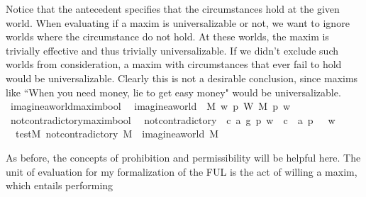 \begin{isabellebody}
{Notice that the antecedent specifies that the circumstances hold at the given world. 
When evaluating if a maxim is universalizable or not, we want to ignore worlds where the circumstance 
do not hold. At these worlds, the maxim is trivially effective and thus trivially universalizable. If we didn't exclude such worlds from 
consideration, a maxim with circumstances that ever fail to hold would be universalizable. Clearly 
this is not a desirable conclusion, since maxims like ``When you need money, lie to get easy money"
would be universalizable.%
}\isanewline
\isanewline
{}\isamarkupfalse%
\ imagine{\isacharunderscore}a{\isacharunderscore}world{\isacharcolon}{\isacharcolon}{\isachardoublequoteopen}maxim{\isasymRightarrow}bool{\isachardoublequoteclose}\ \ \isanewline
{\isachardoublequoteopen}imagine{\isacharunderscore}a{\isacharunderscore}world\ {\isasymequiv}\ {\isasymlambda}M{\isachardot}\ {\isacharparenleft}{\isasymexists}w{\isachardot}\ {\isacharparenleft}{\isasymforall}p{\isachardot}\ {\isacharparenleft}W\ M\ p{\isacharparenright}\ w{\isacharparenright}{\isacharparenright}{\isachardoublequoteclose}\isanewline
%
\isanewline
\isanewline
{}\isamarkupfalse%
\ not{\isacharunderscore}contradictory{\isacharcolon}{\isacharcolon}{\isachardoublequoteopen}maxim{\isasymRightarrow}bool{\isachardoublequoteclose}\ \ \isanewline
{\isachardoublequoteopen}not{\isacharunderscore}contradictory\ {\isasymequiv}\ {\isasymlambda}{\isacharparenleft}c{\isacharcomma}\ a{\isacharcomma}\ g{\isacharparenright}{\isachardot}\ {\isacharparenleft}{\isasymforall}p\ w{\isachardot}\ {\isasymnot}\ {\isacharparenleft}{\isacharparenleft}c\ \isactrlbold {\isasymand}\ {\isacharparenleft}a\ p{\isacharparenright}{\isacharparenright}\ \isactrlbold {\isasymrightarrow}\ \isactrlbold {\isasymbottom}{\isacharparenright}\ w{\isacharparenright}{\isachardoublequoteclose}\isanewline
\isanewline
{}\isamarkupfalse%
\ \ test{\isacharcolon}{\isachardoublequoteopen}{\isasymforall}M{\isachardot}\ not{\isacharunderscore}contradictory\ M\ {\isasymlongrightarrow}\ imagine{\isacharunderscore}a{\isacharunderscore}world\ M{\isachardoublequoteclose}%
\begin{isamarkuptext}%
As before, the concepts of prohibition and permissibility will be helpful here. The unit of 
evaluation for my formalization of the FUL is the act of willing a maxim, which entails performing 

\end{isamarkuptext}
\end{isabellebody}
